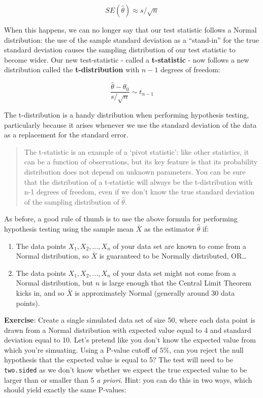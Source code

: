 \documentclass[
]{book}
\begin{document}
\[SE(\hat{\theta}) \approx s/\sqrt{n}\]

When this happens, we can no longer say that our test statistic follows a Normal distribution: the use of the sample standard deviation as a ``stand-in'' for the true standard deviation causes the sampling distribution of our test statistic to become wider. Our new test-statistic - called a \textbf{t-statistic} - now follows a new distribution called the \textbf{t-distribution} with \(n-1\) degrees of freedom:

\[\frac{\hat{\theta} - \theta_0}{s/\sqrt{n}} \sim t_{n-1}\]

The t-distribution is a handy distribution when performing hypothesis testing, particularly because it arises whenever we use the standard deviation of the data as a replacement for the standard error.

\begin{quote}
The t-statistic is an example of a `pivot statistic': like other statistics, it can be a function of observations, but its key feature is that its probability distribution does not depend on unknown parameters. You can be sure that the distribution of a t-statistic will always be the t-distribution with n-1 degrees of freedom, even if we don't know the true standard deviation of the sampling distribution of \(\hat{\theta}\).
\end{quote}

As before, a good rule of thumb is to use the above formula for performing hypothesis testing using the sample mean \(\bar{X}\) as the estimator \(\hat{\theta}\) if:

\begin{enumerate}
\def\labelenumi{\arabic{enumi}.}
\item
  The data points \(X_1, X_2, ..., X_n\) of your data set are known to come from a Normal distribution, so \(\bar{X}\) is guaranteed to be Normally distributed, OR\ldots{}
\item
  The data points \(X_1, X_2, ..., X_n\) of your data set might not come from a Normal distribution, but \(n\) is large enough that the Central Limit Theorem kicks in, and so \(\bar{X}\) is approximately Normal (generally around 30 data points).
\end{enumerate}

\textbf{Exercise}: Create a single simulated data set of size 50, where each data point is drawn from a Normal distribution with expected value equal to 4 and standard deviation equal to 10. Let's pretend like you don't know the expected value from which you're simuating. Using a P-value cutoff of \(5\%\), can you reject the null hypothesis that the expected value is equal to 5? The test will need to be \texttt{two.sided} as we don't know whether we expect the true expected value to be larger than or smaller than 5 \emph{a priori}.
Hint: you can do this in two ways, which should yield exactly the same P-values:
\end{document}

